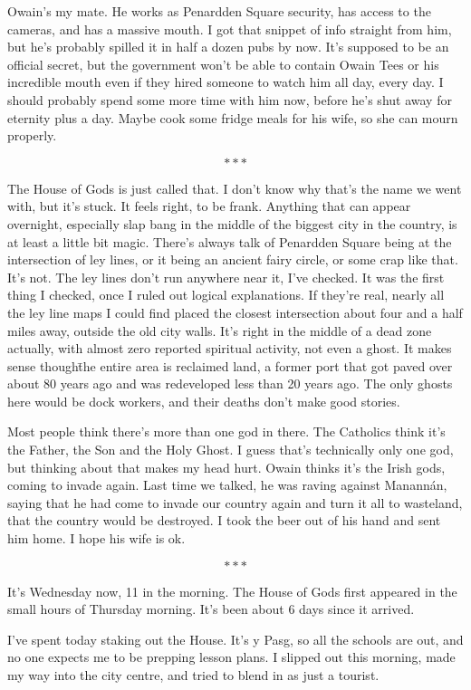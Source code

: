 Owain’s my mate. He works as Penardden Square security, has access to
the cameras, and has a massive mouth. I got that snippet of info
straight from him, but he’s probably spilled it in half a dozen pubs
by now. It’s supposed to be an official secret, but the government
won’t be able to contain Owain Tees or his incredible mouth even if
they hired someone to watch him all day, every day. I should probably
spend some more time with him now, before he’s shut away for eternity
plus a day. Maybe cook some fridge meals for his wife, so she can
mourn properly.

\[***\]

The House of Gods is just called that. I don’t know why that’s the
name we went with, but it’s stuck. It feels right, to be
frank. Anything that can appear overnight, especially slap bang in the
middle of the biggest city in the country, is at least a little bit
magic. There’s always talk of Penardden Square being at the
intersection of ley lines, or it being an ancient fairy circle, or
some crap like that. It’s not. The ley lines don’t run anywhere near
it, I’ve checked. It was the first thing I checked, once I ruled out
logical explanations. If they’re real, nearly all the ley line maps I
could find placed the closest intersection about four and a half miles
away, outside the old city walls. It’s right in the middle of a dead
zone actually, with almost zero reported spiritual activity, not even
a ghost. It makes sense though\=the entire area is reclaimed land, a
former port that got paved over about 80 years ago and was redeveloped
less than 20 years ago. The only ghosts here would be dock workers,
and their deaths don’t make good stories.

Most people think there’s more than one god in there. The Catholics
think it’s the Father, the Son and the Holy Ghost. I guess that’s
technically only one god, but thinking about that makes my head
hurt. Owain thinks it’s the Irish gods, coming to invade again. Last
time we talked, he was raving against Manannán, saying that he had
come to invade our country again and turn it all to wasteland, that
the country would be destroyed. I took the beer out of his hand and
sent him home. I hope his wife is ok.

\[***\]

It’s Wednesday now, 11 in the morning. The House of Gods first
appeared in the small hours of Thursday morning. It’s been about 6
days since it arrived.

I’ve spent today staking out the House. It’s y Pasg, so all the
schools are out, and no one expects me to be prepping lesson plans. I
slipped out this morning, made my way into the city centre, and tried
to blend in as just a tourist.

